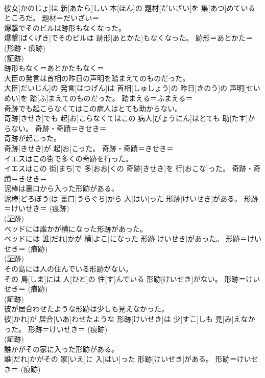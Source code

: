 \documentclass[8pt]{extreport}
\begin{document}
\begin{CJK}{UTF8}{min}
{\\	彼女[かのじょ]は 新[あたら]しい 本[ほん]の 題材[だいざい]を 集[あつ]めているところだ。	題材＝だいざい＝ 
\\	爆撃でそのビルは跡形もなくなった。	
\\	爆撃[ばくげき]でそのビルは 跡形[あとかた]もなくなった。	跡形＝あとかた＝ (形跡・痕跡) 
\\	(証跡) 
\\	跡形もなく＝あとかたもなく＝ 
\\	大臣の発言は首相の昨日の声明を踏まえてのものだった。	
\\	大臣[だいじん]の 発言[はつげん]は 首相[しゅしょう]の 昨日[きのう]の 声明[せいめい]を 踏[ふ]まえてのものだった。	踏まえる＝ふまえる＝ 
\\	奇跡でも起こらなくてはこの病人はとても助からない。	
\\	奇跡[きせき]でも 起[お]こらなくてはこの 病人[びょうにん]はとても 助[たす]からない。	奇跡・奇蹟＝きせき＝ 
\\	奇跡が起こった。	
\\	奇跡[きせき]が 起[お]こった。	奇跡・奇蹟＝きせき＝ 
\\	イエスはこの街で多くの奇跡を行った。	
\\	イエスはこの 街[まち]で 多[おお]くの 奇跡[きせき]を 行[おこな]った。	奇跡・奇蹟＝きせき＝ 
\\	泥棒は裏口から入った形跡がある。	
\\	泥棒[どろぼう]は 裏口[うらぐち]から 入[はい]った 形跡[けいせき]がある。	形跡＝けいせき＝ (痕跡) 
\\	(証跡) 
\\	ベッドには誰かが横になった形跡があった。	
\\	ベッドには 誰[だれ]かが 横[よこ]になった 形跡[けいせき]があった。	形跡＝けいせき＝ (痕跡) 
\\	(証跡) 
\\	その島には人の住んでいる形跡がない。	
\\	その 島[しま]には 人[ひと]の 住[す]んでいる 形跡[けいせき]がない。	形跡＝けいせき＝ (痕跡) 
\\	(証跡) 
\\	彼が居合わせたような形跡は少しも見えなかった。	
\\	彼[かれ]が 居合[いあ]わせたような 形跡[けいせき]は 少[すこ]しも 見[み]えなかった。	形跡＝けいせき＝ (痕跡) 
\\	(証跡) 
\\	誰かがその家に入った形跡がある。	
\\	誰[だれ]かがその 家[いえ]に 入[はい]った 形跡[けいせき]がある。	形跡＝けいせき＝ (痕跡) 
}
\end{CJK}
\end{document}

